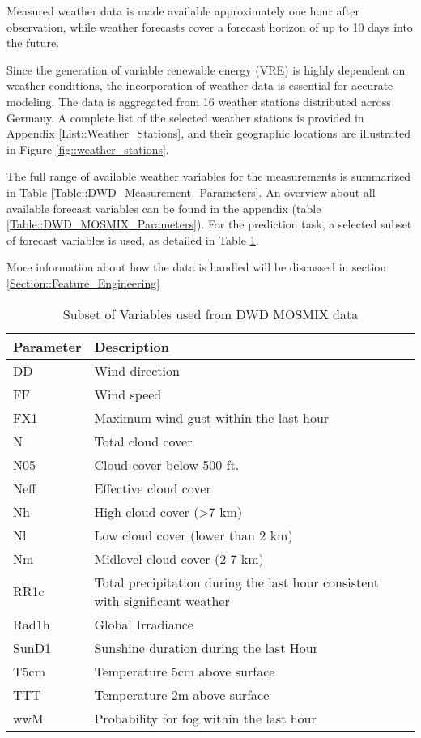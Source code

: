 \documentclass[class=scrbook, crop=false]{standalone}
\begin{document}
Measured weather data is made available approximately one hour after observation, while weather forecasts cover a forecast horizon of up to 10 days into the future.

Since the generation of variable renewable energy (VRE) is highly dependent on weather conditions, the incorporation of weather data is essential for accurate modeling.
The data is aggregated from 16 weather stations distributed across Germany.
A complete list of the selected weather stations is provided in Appendix \ref{List::Weather_Stations}, and their geographic locations are illustrated in Figure \ref{fig::weather_stations}.

The full range of available weather variables for the measurements is summarized in Table \ref{Table::DWD_Measurement_Parameters}.
An overview about all available forecast variables can be found in the appendix (table \ref{Table::DWD_MOSMIX_Parameters}).
For the prediction task, a selected subset of forecast variables is used, as detailed in Table \ref{Table::DWD_MOSMIX_Parameters_Small}.


More information about how the data is handled will be discussed in section \ref{Section::Feature_Engineering}


\begin{table}[]
\centering
\begin{tabular}{l|l}
Parameter & Description \\\hline
DD & Wind direction\\
FF & Wind speed\\
FX1 & Maximum wind gust within the last hour\\
N & Total cloud cover\\
N05 & Cloud cover below 500 ft.\\
Neff & Effective cloud cover\\
Nh & High cloud cover (>7 km)\\
Nl & Low cloud cover (lower than 2 km)\\
Nm & Midlevel cloud cover (2-7 km)\\
RR1c & Total precipitation during the last hour consistent with significant weather\\
Rad1h & Global Irradiance\\
SunD1 & Sunshine duration during the last Hour\\
T5cm & Temperature 5cm above surface\\
TTT & Temperature 2m above surface\\
wwM & Probability for fog within the last hour\\
\end{tabular}
\caption{Subset of Variables used from DWD MOSMIX data}
\label{Table::DWD_MOSMIX_Parameters_Small}
\end{table}
\end{document}
